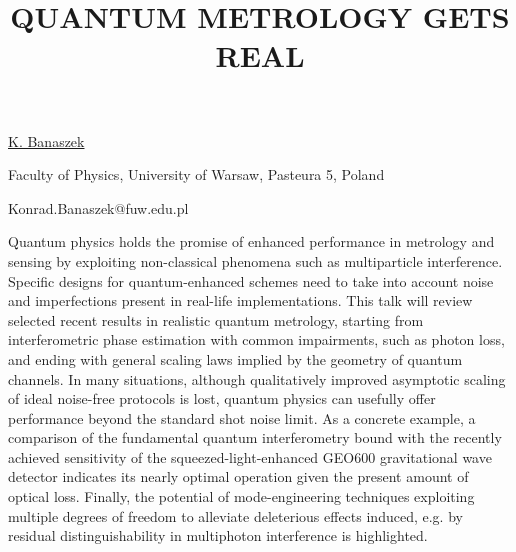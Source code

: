 \title{QUANTUM METROLOGY GETS REAL}

\underline{K. Banaszek} 

{\normalsize{\vspace{-4mm}
Faculty of Physics, University of Warsaw, Pasteura 5, Poland

\email Konrad.Banaszek@fuw.edu.pl}}

Quantum physics holds the promise of enhanced performance in metrology and sensing by exploiting non-classical
phenomena such as multiparticle interference. Specific designs for quantum-enhanced schemes
need to take into account noise and imperfections present in real-life implementations. This talk will
review selected recent results in realistic quantum metrology, starting from interferometric phase
estimation with common impairments, such as photon loss, and ending with general scaling laws implied
by the geometry of quantum channels. In many situations, although qualitatively improved asymptotic
scaling of ideal noise-free protocols is lost, quantum physics can usefully offer performance beyond
the standard shot noise limit. As a concrete example, a comparison of the fundamental quantum
interferometry bound with the recently achieved sensitivity of the squeezed-light-enhanced GEO600
gravitational wave detector indicates its nearly optimal operation given the present amount of optical
loss. Finally, the potential of mode-engineering techniques exploiting multiple degrees of freedom to
alleviate deleterious effects induced, e.g. by residual distinguishability in multiphoton interference
is highlighted.

%
%



\vspace{\baselineskip} 